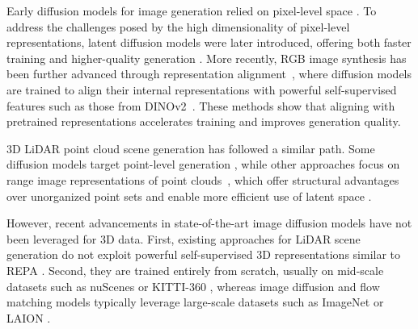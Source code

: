 Early diffusion models for image generation relied on pixel-level space \cite{song2019generative, ho_denoising_2020, song_score-based_2020}. To address the challenges posed by the high dimensionality of pixel-level representations, latent diffusion models were later introduced, offering both faster training and higher-quality generation \cite{rombach_high-resolution_2022, podell2024sdxl, esser2024scaling}. 
More recently, RGB image synthesis has been further advanced through representation alignment~\cite{yu_representation_2025, leng_repa-e_2025, tian_u-repa_2025, yao_reconstruction_2025}, where diffusion models are trained to align their internal representations with powerful self-supervised features such as those from DINOv2~\cite{oquab2024dinov2}. These methods show that aligning with pretrained representations accelerates training and improves generation quality.


3D LiDAR point cloud scene generation has followed a similar path. Some diffusion models target point-level generation \cite{nunes2024scaling, martyniuk2025lidpm, xiong_ultralidar_2023},  while other approaches focus on range image representations of point clouds~\cite{zyrianov2022learning,nakashima_fast_2025,nakashima_lidar_2024}, which offer structural advantages over unorganized point sets and enable more efficient use of latent space \cite{hu_rangeldm_2024, ran_towards_2024}.

However, recent advancements in state-of-the-art image diffusion models have not been leveraged for 3D data. First, existing approaches for LiDAR scene generation do not exploit powerful self-supervised 3D representations similar to REPA \cite{yu_representation_2025}. 
Second, they are trained entirely from scratch, usually on mid-scale datasets such as nuScenes \cite{caesar2020nuscenes} or KITTI-360 \cite{liao2022kitti}, whereas image diffusion and flow matching models typically leverage large-scale datasets such as ImageNet \cite{deng2009imagenet} or LAION \cite{schuhmann2022laion}.

